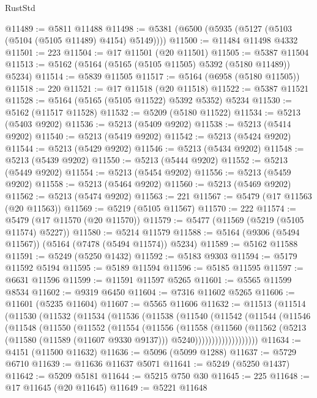 \begin{lexlean}{RustStd}
\begin{coremodule}
@11489 := @5811 @11488
@11498 := @5381 (@6500 (@5935 (@5127 (@5103 (@5104 (@5105 @11489) @4154) @5149))))
@11500 := @11484 @11498 @4332
@11501 := 223
@11504 := @17 @11501 (@20 @11501)
@11505 := @5387 @11504
@11513 := @5162 (@5164 (@5165 (@5105 @11505) @5392 (@5180 @11489)) @5234)
@11514 := @5839 @11505
@11517 := @5164 (@6958 (@5180 @11505))
@11518 := 220
@11521 := @17 @11518 (@20 @11518)
@11522 := @5387 @11521
@11528 := @5164 (@5165 (@5105 @11522) @5392 @5352) @5234
@11530 := @5162 (@11517 @11528)
@11532 := @5209 (@5180 @11522)
@11534 := @5213 (@5403 @9202)
@11536 := @5213 (@5409 @9202)
@11538 := @5213 (@5414 @9202)
@11540 := @5213 (@5419 @9202)
@11542 := @5213 (@5424 @9202)
@11544 := @5213 (@5429 @9202)
@11546 := @5213 (@5434 @9202)
@11548 := @5213 (@5439 @9202)
@11550 := @5213 (@5444 @9202)
@11552 := @5213 (@5449 @9202)
@11554 := @5213 (@5454 @9202)
@11556 := @5213 (@5459 @9202)
@11558 := @5213 (@5464 @9202)
@11560 := @5213 (@5469 @9202)
@11562 := @5213 (@5474 @9202)
@11563 := 221
@11567 := @5479 (@17 @11563 (@20 @11563))
@11569 := @5219 (@5105 @11567)
@11570 := 222
@11574 := @5479 (@17 @11570 (@20 @11570))
@11579 := @5477 (@11569 (@5219 (@5105 @11574) @5227))
@11580 := @5214 @11579
@11588 := @5164 (@9306 (@5494 @11567)) (@5164 (@7478 (@5494 @11574)) @5234)
@11589 := @5162 @11588
@11591 := @5249 (@5250 @1432)
@11592 := @5183 @9303
@11594 := @5179 @11592 @5194
@11595 := @5189 @11594
@11596 := @5185 @11595
@11597 := @6631 @11596
@11599 := @11591 @11597 @5265
@11601 := @5565 @11599 @8534
@11602 := @9319 @6450
@11604 := @7316 @11602 @5265
@11606 := @11601 (@5235 @11604)
@11607 := @5565 @11606
@11632 := @11513
    (@11514
      (@11530
        (@11532
          (@11534
            (@11536
              (@11538
                (@11540
                  (@11542
                    (@11544
                      (@11546
                        (@11548
                          (@11550
                            (@11552
                              (@11554
                                (@11556
                                  (@11558
                                    (@11560
                                      (@11562
                                        (@5213
                                          (@11580 (@11589 (@11607 @9330 @9137)))
                                          @5240)))))))))))))))))))
@11634 := @4151 (@11500 @11632)
@11636 := @5096 (@5099 @1288)
@11637 := @5729 @6710
@11639 := @11636 @11637 @5071
@11641 := @5249 (@5250 @1437)
@11642 := @5209 @5181
@11644 := @5215 @750 @30
@11645 := 225
@11648 := @17 @11645 (@20 @11645)
@11649 := @5221 @11648

\end{coremodule}
\end{lexlean}
